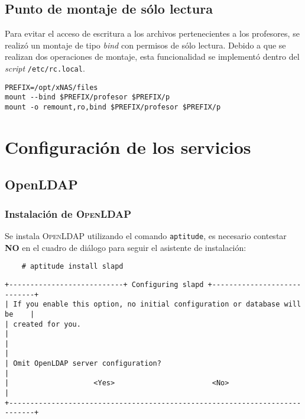       \subsection {Punto de montaje de s\'{o}lo lectura}

Para evitar el acceso de escritura a los archivos pertenecientes a los profesores, se realiz\'{o} un montaje de tipo \textit{bind} con permisos de s\'{o}lo lectura. Debido a que se realizan dos operaciones de montaje, esta funcionalidad se implement\'{o} dentro del \textit{script} \texttt{/etc/rc.local}.


{
\scriptsize
\linespread{1}
\begin{verbatim}
PREFIX=/opt/xNAS/files
mount --bind $PREFIX/profesor $PREFIX/p
mount -o remount,ro,bind $PREFIX/profesor $PREFIX/p
\end{verbatim}
}

    \section {Configuraci\'{o}n de los servicios}

      \subsection {OpenLDAP}

          \subsubsection {Instalaci\'{o}n de \textsc{OpenLDAP}}

Se instala \textsc{OpenLDAP} utilizando el comando \texttt{aptitude}, es necesario contestar \textbf{NO} en el cuadro de di\'{a}logo para seguir el asistente de instalaci\'{o}n:

{
\scriptsize
\linespread{1}
\begin{verbatim}
    # aptitude install slapd
\end{verbatim}
}


{
\scriptsize
\linespread{1}
\begin{verbatim}
+---------------------------+ Configuring slapd +----------------------------+
| If you enable this option, no initial configuration or database will be    |
| created for you.                                                           |
|                                                                            |
| Omit OpenLDAP server configuration?                                        |
|                    <Yes>                       <No>                        |
+----------------------------------------------------------------------------+
\end{verbatim}
}


